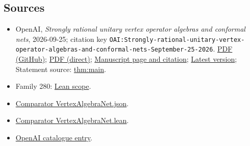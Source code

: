 \documentclass[11pt]{article}
\begin{document}
\subsection{Sources}
\begin{itemize}
\item OpenAI, \emph{Strongly rational unitary vertex operator algebras and conformal nets}, 2026-09-25; citation key \texttt{OAI:Strongly-rational-unitary-vertex-operator-algebras-and-conformal-nets-September-25-2026}. \href{https://github.com/openai/math/blob/adc7f1241b42e322a6451854ab7e4b4c146bf78a/preprints/Strongly-rational-unitary-vertex-operator-algebras-and-conformal-nets-September-25-2026/paper.pdf}{PDF (GitHub)}; \href{https://github.com/openai/math/raw/adc7f1241b42e322a6451854ab7e4b4c146bf78a/preprints/Strongly-rational-unitary-vertex-operator-algebras-and-conformal-nets-September-25-2026/paper.pdf}{PDF (direct)}; \href{https://github.com/openai/math/blob/adc7f1241b42e322a6451854ab7e4b4c146bf78a/preprints/Strongly-rational-unitary-vertex-operator-algebras-and-conformal-nets-September-25-2026/README.md}{Manuscript page and citation}; \href{https://github.com/openai/math/blob/main/preprints/Strongly-rational-unitary-vertex-operator-algebras-and-conformal-nets-September-25-2026/paper.pdf}{Latest version}; Statement source: \href{https://github.com/openai/math/blob/adc7f1241b42e322a6451854ab7e4b4c146bf78a/preprints/Strongly-rational-unitary-vertex-operator-algebras-and-conformal-nets-September-25-2026/build/main.tex\#L96}{thm:main}.
\item Family 280: \href{https://github.com/openai/math/blob/adc7f1241b42e322a6451854ab7e4b4c146bf78a/lean/docs/280.md}{Lean scope}.
\item \href{https://github.com/openai/math/blob/adc7f1241b42e322a6451854ab7e4b4c146bf78a/lean/ComparatorChallenges/VertexAlgebraNet.json}{Comparator VertexAlgebraNet.json}.
\item \href{https://github.com/openai/math/blob/adc7f1241b42e322a6451854ab7e4b4c146bf78a/lean/ComparatorChallenges/VertexAlgebraNet.lean}{Comparator VertexAlgebraNet.lean}.
\item \href{https://github.com/openai/math/blob/adc7f1241b42e322a6451854ab7e4b4c146bf78a/CONTENTS.md}{OpenAI catalogue entry}.
\end{itemize}
\end{document}
